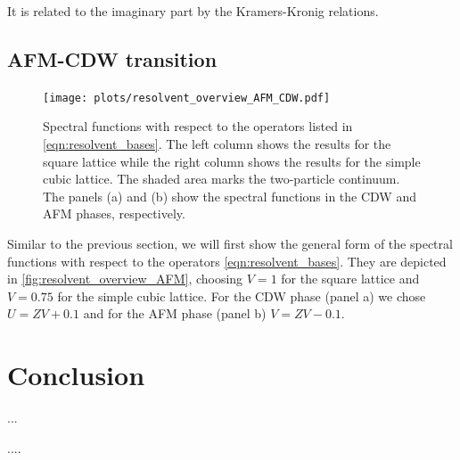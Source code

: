 \documentclass[
    reprint, 
    aps,
    preprintnumbers,
    twocolumn,
    prb,
    superscriptaddress
]{revtex4-2}
\begin{document}
It is related to the imaginary part by the Kramers-Kronig relations.

\subsection{AFM-CDW transition}

\begin{figure}
    \centering
    \texttt{[image: plots/resolvent\_overview\_AFM\_CDW.pdf]}
    \caption{Spectral functions with respect to the operators listed in \eqref{eqn:resolvent_bases}.
    The left column shows the results for the square lattice while the right column shows the results for the simple cubic lattice.
    The shaded area marks the two-particle continuum.
    The panels (a) and (b) show the spectral functions in the CDW and AFM phases, respectively.}
    \label{fig:resolvent_overview_AFM}
\end{figure}

Similar to the previous section, we will first show the general form of the spectral functions with respect to the operators \eqref{eqn:resolvent_bases}.
They are depicted in \autoref{fig:resolvent_overview_AFM}, choosing $V=1$ for the square lattice and $V=0.75$ for the simple cubic lattice.
For the CDW phase (panel a) we chose $U=ZV + 0.1$ and for the AFM phase (panel b) $V=ZV - 0.1$.



\section{Conclusion}\label{sec:conclusion}

...


\begin{acknowledgments} 
    ....
\end{acknowledgments}


%
		
\end{document}

